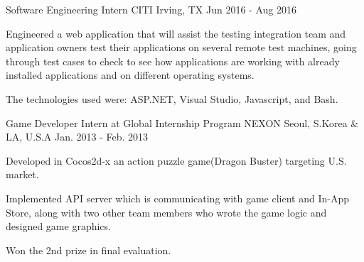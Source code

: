 \begin{cventries}
  \cventry
    {Software Engineering Intern} %
    {CITI} %
    {Irving, TX} %
    {Jun 2016 - Aug 2016} %
    {
      \begin{cvitems} %
        \item {Engineered a web application that will assist the testing integration team and application owners test their applications on several remote test machines, going through test cases to check to see how applications are working with already installed applications and on different operating systems. }
        \item {The technologies used were: ASP.NET, Visual Studio, Javascript, and Bash. }
      \end{cvitems}
    }

  \cventry
    {Game Developer Intern at Global Internship Program} %
    {NEXON} %
    {Seoul, S.Korea \& LA, U.S.A} %
    {Jan. 2013 - Feb. 2013} %
    {
      \begin{cvitems} %
        \item {Developed in Cocos2d-x an action puzzle game(Dragon Buster) targeting U.S. market.}
        \item {Implemented API server which is communicating with game client and In-App Store, along with two other team members who wrote the game logic and designed game graphics.}
        \item {Won the 2nd prize in final evaluation.}
      \end{cvitems}
    }

\end{cventries}
